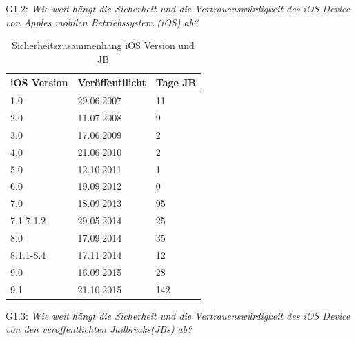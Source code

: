 G1.2: \textit{\glqq Wie weit hängt die Sicherheit und die Vertrauenswürdigkeit des iOS Device von Apples mobilen Betriebssystem (iOS) ab?\grqq{}}
\begin{table}[htp!]
    \begin{center}
        \begin{tabular}{|l|l|l|} \hline
         \textbf{iOS Version} & \textbf{Veröffentilicht} & \textbf{Tage JB}\\ \hline    
        1.0 & 29.06.2007 & 11\\ \hline 
        2.0 & 11.07.2008	& 9\\ \hline 
        3.0 & 17.06.2009	& 2\\ \hline 
        4.0 & 21.06.2010 & 2\\ \hline 
        5.0 & 12.10.2011	& 1\\ \hline 
        6.0 & 19.09.2012	& 0\\ \hline 
        7.0 & 18.09.2013	& 95\\ \hline 
        7.1-7.1.2 & 29.05.2014 & 25\\ \hline 
        8.0 & 17.09.2014	& 35\\ \hline 
        8.1.1-8.4 & 17.11.2014	& 12\\ \hline 
        9.0 & 16.09.2015	& 28\\ \hline
        9.1 & 21.10.2015	& 142\\ \hline 
        \end{tabular} 
        \caption{Sicherheitszusammenhang iOS Version und JB}
        \label{tab:iOSVersion}
    \end{center}
\end{table}

G1.3: \textit{\glqq Wie weit hängt die Sicherheit und die Vertrauenswürdigkeit des iOS Device von den veröffentlichten Jailbreaks(JBs) ab?\grqq{}}

